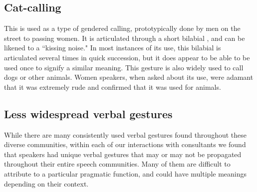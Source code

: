 \documentclass[output=paper,newtxmath,modfonts,nonflat,hidelinks]{langsci/langscibook}
\begin{document}
\subsection{Cat-calling}

This  is used as a type of gendered calling, prototypically done by men on the street to passing women. It is articulated through a short bilabial , and can be likened to a ``kissing noise." In most instances of its use, this bilabial  is articulated several times in quick succession, but it does appear to be able to be used once to signify a similar meaning. This gesture is also widely used to call dogs or other animals. Women speakers, when asked about its use, were adamant that it was extremely rude and confirmed that it was used for animals. 





\subsection{Less widespread verbal gestures}\label{sec:pillion:less}
While there are many consistently used verbal gestures found throughout these diverse communities, within each of our interactions with consultants we found that speakers had unique verbal gestures that may or may not be propagated throughout their entire speech communities. Many of them are difficult to attribute to a particular pragmatic function, and could have multiple meanings depending on their context. 
\end{document}

